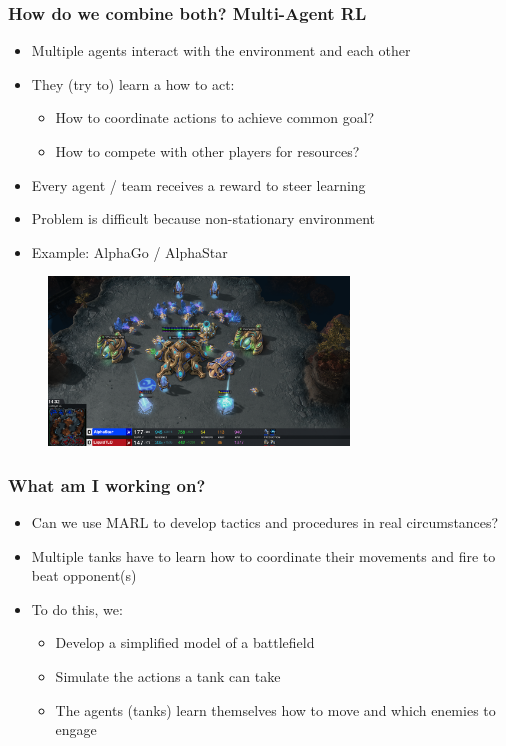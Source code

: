 \documentclass{beamer}
\begin{document}
\begin{frame}
\frametitle{How do we combine both? Multi-Agent RL}
\begin{itemize}
    \item Multiple agents interact with the environment and each other
    \item They (try to) learn a how to act:
        \begin{itemize}
            \item How to coordinate actions to achieve common goal?
            \item How to compete with other players for resources?
        \end{itemize}
    \item Every agent / team receives a reward to steer learning
    \item Problem is difficult because non-stationary environment
    \item Example: AlphaGo / AlphaStar
\end{itemize}
\begin{figure}[htp]
    \centering
    \includegraphics[width=8cm]{images/starcraft.png}
    \label{fig:mdp}
\end{figure}
\end{frame}

\begin{frame}
\frametitle{What am I working on?}
\begin{itemize}
    \item Can we use MARL to develop tactics and procedures in real circumstances?
    \item Multiple tanks have to learn how to coordinate their movements and fire to beat opponent(s)
    \item To do this, we:
        \begin{itemize}
            \item Develop a simplified model of a battlefield
            \item Simulate the actions a tank can take
            \item The agents (tanks) learn themselves how to move and which enemies to engage
        \end{itemize}
\end{itemize}
\end{frame}
\end{document}
